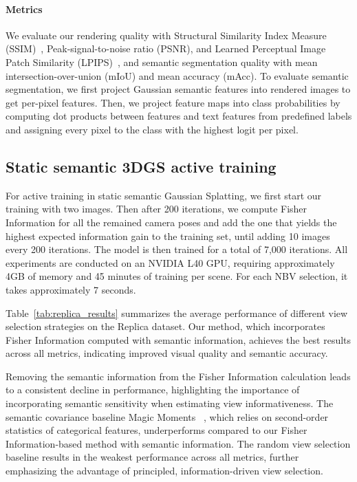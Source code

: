 \paragraph{Metrics}
We evaluate our rendering quality with Structural Similarity Index Measure (SSIM)~\cite{ssim}, Peak-signal-to-noise ratio (PSNR), and Learned Perceptual Image Patch Similarity (LPIPS)~\cite{lpips}, and semantic segmentation quality with mean intersection-over-union (mIoU) and mean accuracy (mAcc).  
To evaluate semantic segmentation, we first project Gaussian semantic features into rendered images to get per-pixel features. Then, we project feature maps into class probabilities by computing dot products between features and text features from predefined labels and assigning every pixel to the class with the highest logit per pixel.

 \subsection{Static semantic 3DGS active training}
For active training in static semantic Gaussian Splatting, we first start our training with two images. Then after 200 iterations, we compute Fisher Information for all the remained camera poses and add the one that yields the highest expected information gain to the training set, until adding 10 images every 200 iterations. The model is then trained for a total of 7,000 iterations. All experiments are conducted on an NVIDIA L40 GPU, requiring approximately 4GB of memory and 45 minutes of training per scene. For each NBV selection, it takes approximately 7 seconds.

Table~\ref{tab:replica_results} summarizes the average performance of different view selection strategies on the Replica dataset. Our method, which incorporates Fisher Information computed with semantic information, achieves the best results across all metrics, indicating improved visual quality and semantic accuracy.

Removing the semantic information from the Fisher Information calculation leads to a consistent decline in performance, highlighting the importance of incorporating semantic sensitivity when estimating view informativeness. The semantic covariance baseline Magic Moments ~\cite{MagicMoments}, which relies on second-order statistics of categorical features, underperforms compared to our Fisher Information-based method with semantic information. The random view selection baseline results in the weakest performance across all metrics, further emphasizing the advantage of principled, information-driven view selection.





